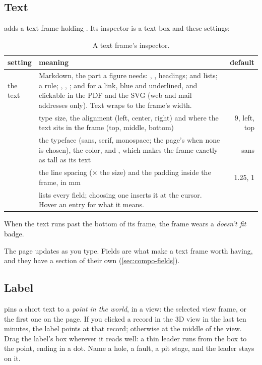 \subsection{Text}

 adds a text frame holding . Its inspector is a text box and these settings:

\begin{table}[htbp]\small
\begin{tabularx}{\linewidth}{@{}lMD@{}}\toprule
setting & meaning & default \\ \midrule
the text & Markdown, the part a figure needs: \code{\#}, \code{\#\#}, \code{\#\#\#} headings; \code{-} and  lists; \code{---} a rule; , , ; and  for a link, blue and underlined, and clickable in the PDF and the SVG (web and mail addresses only). Text wraps to the frame's width. & \\
 & type size, the alignment (left, center, right) and where the text sits in the frame (top, middle, bottom) & 9, left, top \\
 & the typeface (sans, serif, monospace; the page's when none is chosen), the color, and , which makes the frame exactly as tall as its text & sans \\
 & the line spacing (× the size) and the padding inside the frame, in mm & 1.25, 1 \\
 &  lists every field; choosing one inserts it at the cursor. Hover an entry for what it means. & \\ \bottomrule
\end{tabularx}
\caption{A text frame's inspector.}\label{tab:compo-text}
\end{table}

When the text runs past the bottom of its frame, the frame wears a \emph{doesn't fit} badge.

The page updates as you type. Fields are what make a text frame worth having, and they have a section of their own (\cref{sec:compo-fields}).

\subsection{Label}

 pins a short text to a \emph{point in the world}, in a view: the selected view frame, or the first one on the page. If you clicked a record in the 3D view in the last ten minutes, the label points at that record; otherwise at the middle of the view. Drag the label's box wherever it reads well: a thin leader runs from the box to the point, ending in a dot. Name a hole, a fault, a pit stage, and the leader stays on it.

